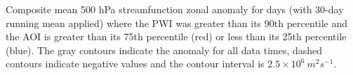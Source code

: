\label{fig:sam_composite}
Composite mean 500 hPa streamfunction zonal anomaly for days (with 30-day running mean applied) where the PWI was greater than its 90th percentile and the AOI is greater than its 75th percentile (red) or less than its 25th percentile (blue). The gray contours indicate the anomaly for all data times, dashed contours indicate negative values and the contour interval is $2.5 \times 10^6 \: m^2 s^{-1}$. 